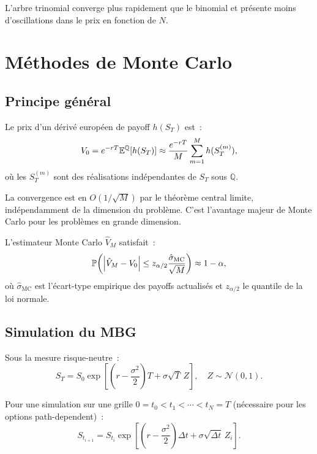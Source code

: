 \begin{remarque}
L'arbre trinomial converge plus rapidement que le binomial et pr\'esente
moins d'oscillations dans le prix en fonction de $N$.
\end{remarque}

\section{M\'ethodes de Monte Carlo}

\subsection{Principe g\'en\'eral}

\begin{theoreme}
Le prix d'un d\'eriv\'e europ\'een de payoff $h(S_T)$ est~:
\[
    V_0 = e^{-rT}\mathbb{E}^\mathbb{Q}[h(S_T)]
        \approx \frac{e^{-rT}}{M}\sum_{m=1}^{M} h(S_T^{(m)}),
\]
o\`u les $S_T^{(m)}$ sont des r\'ealisations ind\'ependantes de $S_T$
sous $\mathbb{Q}$.
\end{theoreme}

La convergence est en $O(1/\sqrt{M})$ par le th\'eor\`eme central limite,
ind\'ependamment de la dimension du probl\`eme. C'est l'avantage majeur
de Monte Carlo pour les probl\`emes en grande dimension.

\begin{proposition}
L'estimateur Monte Carlo $\hat{V}_M$ satisfait~:
\[
    \mathbb{P}\!\left(\left| \hat{V}_M - V_0 \right| \leq z_{\alpha/2}
    \frac{\hat{\sigma}_{\text{MC}}}{\sqrt{M}}\right) \approx 1 - \alpha,
\]
o\`u $\hat{\sigma}_{\text{MC}}$ est l'\'ecart-type empirique des payoffs
actualis\'es et $z_{\alpha/2}$ le quantile de la loi normale.
\end{proposition}

\subsection{Simulation du MBG}

Sous la mesure risque-neutre~:
\[
    S_T = S_0 \exp\!\left[\left(r - \frac{\sigma^2}{2}\right)T
          + \sigma\sqrt{T}\,Z\right], \quad Z \sim \mathcal{N}(0,1).
\]

Pour une simulation sur une grille $0 = t_0 < t_1 < \cdots < t_N = T$
(n\'ecessaire pour les options path-dependent)~:
\[
    S_{t_{i+1}} = S_{t_i} \exp\!\left[\left(r - \frac{\sigma^2}{2}\right)
    \Delta t + \sigma\sqrt{\Delta t}\,Z_i\right].
\]

